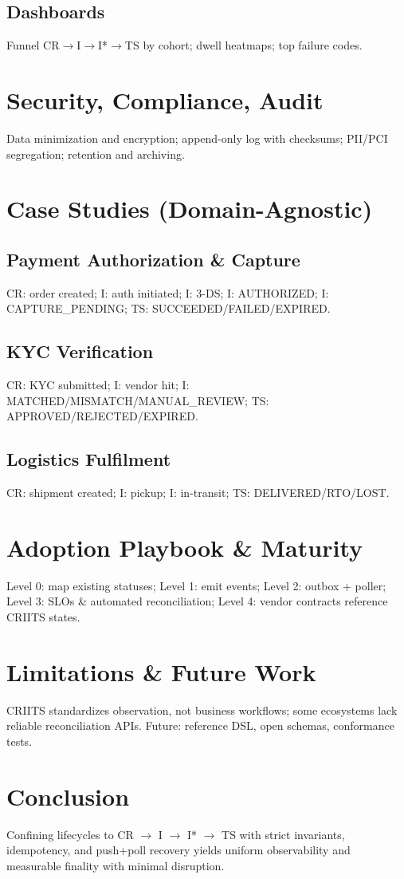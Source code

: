 \documentclass[11pt]{article}
\begin{document}
\subsection{Dashboards}
Funnel CR$\to$I$\to$I*$\to$TS by cohort; dwell heatmaps; top failure codes.

\section{Security, Compliance, Audit}
Data minimization and encryption; append-only log with checksums; PII/PCI segregation; retention and archiving.

\section{Case Studies (Domain-Agnostic)}
\subsection{Payment Authorization \& Capture}
CR: order created; I: auth initiated; I: 3-DS; I: AUTHORIZED; I: CAPTURE\_PENDING; TS: SUCCEEDED/FAILED/EXPIRED.
\subsection{KYC Verification}
CR: KYC submitted; I: vendor hit; I: MATCHED/MISMATCH/MANUAL\_REVIEW; TS: APPROVED/REJECTED/EXPIRED.
\subsection{Logistics Fulfilment}
CR: shipment created; I: pickup; I: in-transit; TS: DELIVERED/RTO/LOST.

\section{Adoption Playbook \& Maturity}
Level 0: map existing statuses; Level 1: emit events; Level 2: outbox + poller; Level 3: SLOs \& automated reconciliation; Level 4: vendor contracts reference CRIITS states.

\section{Limitations \& Future Work}
CRIITS standardizes observation, not business workflows; some ecosystems lack reliable reconciliation APIs. Future: reference DSL, open schemas, conformance tests.

\section{Conclusion}
Confining lifecycles to CR $\to$ I $\to$ I* $\to$ TS with strict invariants, idempotency, and push+poll recovery yields uniform observability and measurable finality with minimal disruption.
\end{document}
